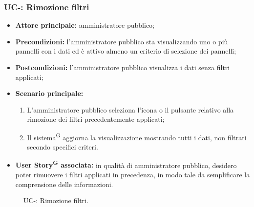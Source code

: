 \documentclass[8pt]{article}
\newcommand{\glossterm}[1]{#1\textsuperscript{G}} %
\begin{document}
\subsubsection*{UC-\ucnumber: Rimozione filtri}
\begin{itemize}
    \item \textbf{Attore principale:} amministratore pubblico;
    \item \textbf{Precondizioni:} l’amministratore pubblico sta visualizzando uno o più pannelli con i dati ed è attivo almeno un criterio di selezione dei pannelli;
    \item \textbf{Postcondizioni:} l’amministratore pubblico visualizza i dati senza filtri applicati;
    \item \textbf{Scenario principale:}
        \begin{enumerate}
        \item L’amministratore pubblico seleziona l’icona o il pulsante relativo alla rimozione dei filtri precedentemente applicati;
        \item Il \glossterm{sistema} aggiorna la visualizzazione mostrando tutti i dati, non filtrati secondo specifici criteri.
        \end{enumerate}
    \item \textbf{\glossterm{User Story} associata:} in qualità di amministratore pubblico, desidero poter rimuovere i filtri applicati in precedenza, in modo tale da semplificare la comprensione delle informazioni.
\end{itemize}
\begin{figure}[ht!]
    \centering
    \caption{UC-\theuc: Rimozione filtri.}
    \label{fig:UC-\theuc: Rimozione filtri}
\end{figure}
\end{document}
